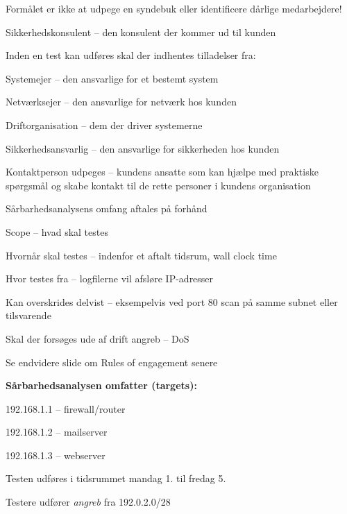 \documentclass[20pt,landscape,a4paper,footrule]{foils}
\begin{document}
Formålet er ikke at udpege en syndebuk eller
identificere dårlige medarbejdere!



\begin{list1}
\item Sikkerhedskonsulent -- den konsulent der kommer ud til kunden
\item Inden en test kan udføres skal der indhentes tilladelser fra:
\begin{list2}
\item Systemejer -- den ansvarlige for et bestemt system
\item Netværksejer -- den ansvarlige for netværk hos kunden
\item Driftorganisation -- dem der driver systemerne
\item Sikkerhedsansvarlig -- den ansvarlige for sikkerheden hos kunden
\item Kontaktperson udpeges -- kundens ansatte som kan hjælpe med praktiske
  spørgsmål og skabe kontakt til de rette personer i kundens organisation
\end{list2}
\end{list1}


\begin{list1}
\item Sårbarhedsanalysens omfang aftales på forhånd
\begin{list2}
\item Scope -- hvad skal testes
\item Hvornår skal testes -- indenfor et aftalt tidsrum, wall clock time
\item Hvor testes fra -- logfilerne vil afsløre IP-adresser
\item Kan overskrides delvist -- eksempelvis ved port 80 scan på samme
  subnet eller tilsvarende
\item Skal der forsøges ude af drift angreb -- DoS
\item Se endvidere slide om Rules of engagement senere
\end{list2}
\item {\bf Sårbarhedsanalysen omfatter (targets):}
\begin{list2}
\item 192.168.1.1 -- firewall/router
\item 192.168.1.2 -- mailserver
\item 192.168.1.3 -- webserver
\item Testen udføres i tidsrummet mandag 1. til fredag 5.
\item Testere udfører \emph{angreb} fra 192.0.2.0/28
\end{list2}
\end{list1}
\end{document}
